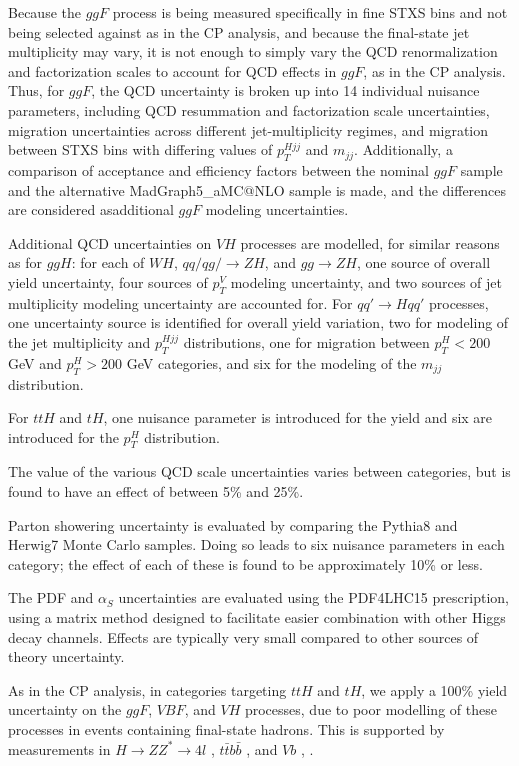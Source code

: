Because the $ggF$ process is being measured specifically in fine STXS bins and not being selected against as in the CP analysis, and because the final-state jet multiplicity may vary, it is not enough to simply vary the QCD renormalization and factorization scales to account for QCD effects in $ggF$, as in the CP analysis. Thus, for $ggF$, the QCD uncertainty is broken up into 14 individual nuisance parameters, including QCD resummation and factorization scale uncertainties, migration uncertainties across different jet-multiplicity regimes, and migration between STXS bins with differing values of $p_{T}^{Hjj}$ and $m_{jj}$. Additionally, a comparison of acceptance and efficiency factors between the nominal $ggF$ sample and the alternative MadGraph5\_aMC@NLO sample is made, and the differences are considered asadditional $ggF$ modeling uncertainties.

Additional QCD uncertainties on $VH$ processes are modelled, for similar reasons as for $ggH$: for each of $WH$, $qq/qg/ \rightarrow ZH$, and $gg \rightarrow ZH$, one source of overall yield uncertainty, four sources of $p_{T}^{V}$ modeling uncertainty, and two sources of jet multiplicity modeling uncertainty are accounted for. For $qq' \rightarrow H qq'$ processes, one uncertainty source is identified for overall yield variation, two for modeling of the jet multiplicity and $p_{T}^{Hjj}$ distributions, one for migration between $p_{T}^{H} < 200$ GeV and $p_{T}^{H} > 200$ GeV categories, and six for the modeling of the $m_{jj}$ distribution.

For $ttH$ and $tH$, one nuisance parameter is introduced for the yield and six are introduced for the $p_{T}^{H}$ distribution.

The value of the various QCD scale uncertainties varies between categories, but is found to have an effect of between 5\% and 25\%.

Parton showering uncertainty is evaluated by comparing the Pythia8 and Herwig7 Monte Carlo samples. Doing so leads to six nuisance parameters in each category; the effect of each of these is found to be approximately 10\% or less.

The PDF and $\alpha_{S}$ uncertainties are evaluated using the PDF4LHC15 \cite{PDF4LHC} prescription, using a matrix method designed to facilitate easier combination with other Higgs decay channels. Effects are typically very small compared to other sources of theory uncertainty.

As in the CP analysis, in categories targeting $ttH$ and $tH$, we apply a 100\% yield uncertainty on the $ggF$, $VBF$, and $VH$ processes, due to poor modelling of these processes in events containing final-state hadrons. This is supported by measurements in $H \rightarrow ZZ^{*}\rightarrow 4l$ \cite{HZZ4l}, $t\bar{t}b\bar{b}$ \cite{ttbb}, and $Vb$ \cite{Wb}, \cite{Zb}.

